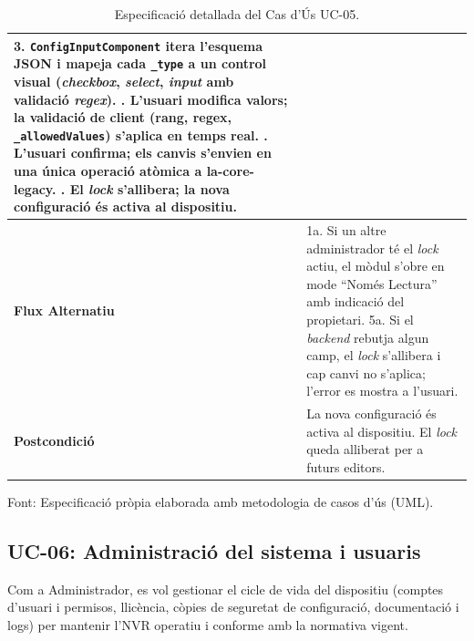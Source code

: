 \begin{table}[htbp]
\begin{tabular}{|l|p{10cm}|}
    3. \texttt{ConfigInputComponent} itera l'esquema JSON i mapeja cada \texttt{\_type} a un control visual (\textit{checkbox}, \textit{select}, \textit{input} amb validació \textit{regex}). \newline
    4. L'usuari modifica valors; la validació de client (rang, regex, \texttt{\_allowedValues}) s'aplica en temps real. \newline
    5. L'usuari confirma; els canvis s'envien en una única operació atòmica a \textbf{la-core-legacy}. \newline
    6. El \textit{lock} s'allibera; la nova configuració és activa al dispositiu.                                                 \\ \hline
    \textbf{Flux Alternatiu}                &
    1a. Si un altre administrador té el \textit{lock} actiu, el mòdul s'obre en mode ``Només Lectura'' amb indicació del propietari. \newline
    5a. Si el \textit{backend} rebutja algun camp, el \textit{lock} s'allibera i cap canvi no s'aplica; l'error es mostra a l'usuari.      \\ \hline
    \textbf{Postcondició}                   & La nova configuració és activa al dispositiu. El \textit{lock} queda alliberat per a futurs editors.                          \\ \hline
  \end{tabular}
  \caption{Especificació detallada del Cas d'Ús UC-05.}
  \label{tab:uc_config}
\par\smallskip
\small Font: Especificació pròpia elaborada amb metodologia de casos d'ús (UML).
\end{table}

\clearpage
\subsection{UC-06: Administració del sistema i usuaris}
Com a Administrador, es vol gestionar el cicle de vida del dispositiu (comptes d'usuari i permisos, llicència, còpies de seguretat de configuració, documentació i logs) per mantenir l'NVR operatiu i conforme amb la normativa vigent.

